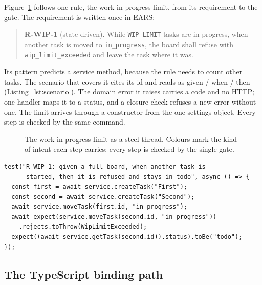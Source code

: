 Figure~\ref{fig:thread} follows one rule, the work-in-progress limit, from its requirement to
the gate. The requirement is written once in EARS:

\begin{quote}\small
\textbf{R-WIP-1} (state-driven). While \texttt{WIP\_LIMIT} tasks are in progress, when another
task is moved to \texttt{in\_progress}, the board shall refuse with
\texttt{wip\_limit\_exceeded} and leave the task where it was.
\end{quote}

\noindent Its pattern predicts a service method, because the rule needs to count other tasks.
The scenario that covers it cites its id and reads as given / when / then
(Listing~\ref{lst:scenario}). The domain error it raises carries a code and no HTTP; one handler
maps it to a status, and a closure check refuses a new error without one. The limit arrives
through a constructor from the one settings object. Every step is checked by the same command.

\begin{figure}[t]
  \centering
  \resizebox{\linewidth}{!}{}
  \caption{The work-in-progress limit as a steel thread. Colours mark the kind of intent each
  step carries; every step is checked by the single gate.}
  \label{fig:thread}
\end{figure}

\begin{lstlisting}[caption={A scenario in the TypeScript receiver. The title cites the requirement and reads given / when / then; the requirement check fails if either is missing.},label=lst:scenario]
test("R-WIP-1: given a full board, when another task is
      started, then it is refused and stays in todo", async () => {
  const first = await service.createTask("First");
  const second = await service.createTask("Second");
  await service.moveTask(first.id, "in_progress");
  await expect(service.moveTask(second.id, "in_progress"))
    .rejects.toThrow(WipLimitExceeded);
  expect((await service.getTask(second.id)).status).toBe("todo");
});
\end{lstlisting}

\subsection{The TypeScript binding path}

